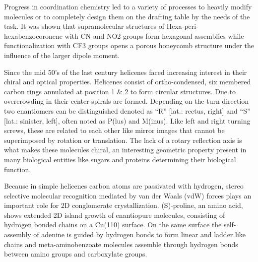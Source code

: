 Progress in coordination chemistry led to a variety of processes to heavily modify molecules or to completely design them on the drafting table by the needs of the task. It was shown that supramolecular structures of Hexa-peri-hexabenzocoronene with CN and NO2 groups form hexagonal assemblies while functionalization with CF3 groups opens a porous honeycomb structure under the influence of the larger dipole moment.\cite{Mu_Effect_2011}

Since the mid 50’s of the last century helicenes faced increasing interest in their chiral and optical properties.\cite{Newman_synthesis_1956, Rau_Exciplex_1992, Donckt_Flourescence_1968} Helicenes consist of ortho-condensed, six membered carbon rings annulated at position 1 \& 2 to form circular structures. Due to overcrowding in their center spirals are formed. Depending on the turn direction two enantiomers can be distinguished denoted as “R” [lat.: rectus, right] and “S” [lat.: sinister, left], often noted as P(lus) and M(inus). Like left and right turning screws, these are related to each other like mirror images that cannot be superimposed by rotation or translation. The lack of a rotary reflection axis is what makes these molecules chiral, an interesting geometric property present in many biological entities like sugars and proteins determining their biological function. 

Because in simple helicenes carbon atoms are passivated with hydrogen, stereo selective molecular recognition mediated by van der Waals (vdW) forces plays an important role for 2D conglomerate crystallization.\cite{} (S)-proline, an amino acid, shows extended 2D island growth of enantiopure molecules, consisting of hydrogen bonded chains on a Cu(110) surface.\cite{} On the same surface the self-assembly of adenine is guided by hydrogen bonds to form linear and ladder like chains\cite{} and meta-aminobenzoate molecules assemble through hydrogen bonds between amino groups and carboxylate groups.\cite{}


